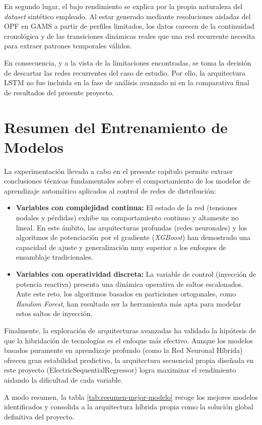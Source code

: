 En segundo lugar, el bajo rendimiento se explica por la propia naturaleza del \textit{dataset} sintético empleado. Al estar generado mediante resoluciones aisladas del OPF en GAMS a partir de perfiles limitados, los datos carecen de la continuidad cronológica y de las transiciones dinámicas reales que una red recurrente necesita para extraer patrones temporales válidos.

En consecuencia, y a la vista de la limitaciones encontradas, se toma la decisión de descartar las redes recurrentes del caso de estudio. Por ello, la arquitectura LSTM no fue incluida en la fase de análisis avanzado ni en la comparativa final de resultados del presente proyecto.

\section{Resumen del Entrenamiento de Modelos}\label{sec:resumen-entrenamiento}
La experimentación llevada a cabo en el presente capítulo permite extraer conclusiones técnicas fundamentales sobre el comportamiento de los modelos de aprendizaje automático aplicados al control de redes de distribución:
\begin{itemize}
	\item \textbf{Variables con complejidad continua:} El estado de la red (tensiones nodales y pérdidas) exhibe un comportamiento continuo y altamente no lineal. En este ámbito, las arquitecturas profundas (redes neuronales) y los algoritmos de potenciación por el gradiente (\textit{XGBoost}) han demostrado una capacidad de ajuste y generalización muy superior a los enfoques de ensamblaje tradicionales.
	\item \textbf{Variables con operatividad discreta:} La variable de control (inyección de potencia reactiva) presenta una dinámica operativa de saltos escalonados. Ante este reto, los algoritmos basados en particiones ortogonales, como \textit{Random Forest}, han resultado ser la herramienta más apta para modelar estos saltos de inyección.
\end{itemize}

Finalmente, la exploración de arquitecturas avanzadas ha validado la hipótesis de que la hibridación de tecnologías es el enfoque más efectivo. Aunque los modelos basados puramente en aprendizaje profundo (como la Red Neuronal Híbrida) ofrecen gran estabilidad predictiva, la arquitectura secuencial propia diseñada en este proyecto (ElectricSequentialRegressor) logra maximizar el rendimiento aislando la dificultad de cada variable.

A modo resumen, la tabla \ref{tab:resumen-mejor-modelo} recoge los mejores modelos identificados y consolida a la arquitectura híbrida propia como la solución global definitiva del proyecto.
